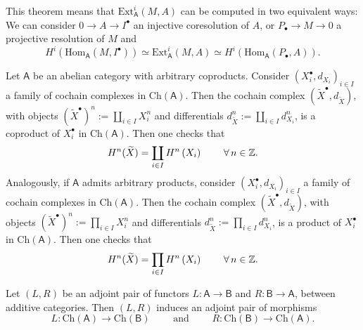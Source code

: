 \begin{rem}[Consequence]
	This theorem means that $\mathrm{Ext}^i_{\mathsf{A}}(M,A)$
	can be computed in two equivalent ways:
	We can consider $0 \to A \to I^\bullet$ an injective coresolution of $A$,
	or $P_{\bullet} \to M \to 0$ a projective resolution of $M$
	and
	\begin{equation}
		H^i \left( \mathrm{Hom}_{\mathsf{A}} \left( M, I^\bullet \right) \right) \simeq
		\mathrm{Ext}^i_{\mathsf{A}} (M,A) \simeq
		H^i \left( \mathrm{Hom}_{\mathsf{A}} \left( P_{\bullet}, A \right) \right)
	.\end{equation} 
\end{rem}

\begin{rem}[]
	Let $\mathsf{A}$ be an abelian category with arbitrary coproducts.
	Consider $\left( X_i^{\bullet}, d_{X_i} \right)_{i \in I}$ a family
	of cochain complexes in $\mathrm{Ch}(\mathsf{A})$.
	Then the cochain complex $( \widetilde{X}^{\bullet}, d_{\widetilde{X}} )$, with
	objects $( \widetilde{X}^\bullet )^n := \coprod_{i \in I} X_i^n$
	and differentials $d^n_{\widetilde{X}} := \coprod_{i \in I} d^n_{X_i}$,
	is a coproduct of $X_i^\bullet$ in $\mathrm{Ch}(\mathsf{A})$.
	Then one checks that
	\begin{equation}
	H^{n}( \widetilde{X} ) = 
	\coprod_{i \in I} H^{n}\left( X_i \right)
	\qquad \,\forall\, n \in \mathbb{Z}
	.\end{equation} 
	Analogously, if $\mathsf{A}$ admits arbitrary products,
	consider $( X_i^{\bullet}, d_{X_i} )_{i \in I}$ a family
	of cochain complexes in $\mathrm{Ch}(\mathsf{A})$.
	Then the cochain complex $( \widetilde{X}^{\bullet}, d_{\widetilde{X}} )$, with
	objects $( \widetilde{X}^\bullet )^n := \prod_{i \in I} X_i^n$
	and differentials $d^n_{\widetilde{X}} := \prod_{i \in I} d^n_{X_i}$,
	is a product of $X_i^\bullet$ in $\mathrm{Ch}(\mathsf{A})$.
	Then one checks that
	\begin{equation}
	H^{n}( \widetilde{X} ) = 
	\prod_{i \in I} H^{n}\left( X_i \right)
	\qquad \,\forall\, n \in \mathbb{Z}
	.\end{equation} 
\end{rem}

\begin{lem}
	Let $\left(L, R\right)$ be an adjoint pair of functors
	$L: \mathsf{A} \to \mathsf{B}$ and $R: \mathsf{B} \to \mathsf{A}$,
	between additive categories.
	Then $\left(L, R\right)$ induces an adjoint pair of morphisms
	\begin{equation}
	L: \mathrm{Ch}(\mathsf{A}) \to \mathrm{Ch}(\mathsf{B})
	\qquad \text{ and } \qquad
	R: \mathrm{Ch}(\mathsf{B}) \to \mathrm{Ch}(\mathsf{A})
	.\end{equation} 
\end{lem} 

